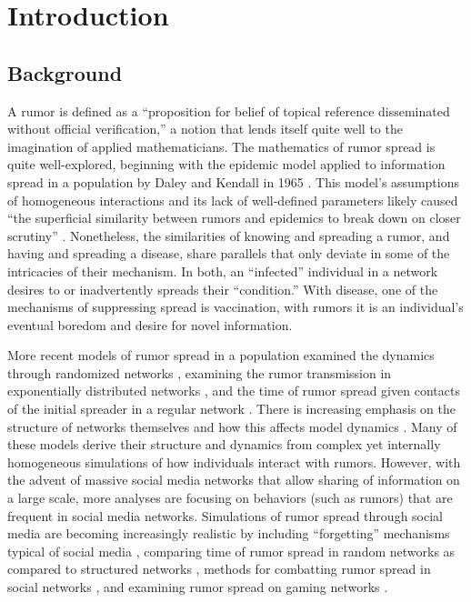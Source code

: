 \section{Introduction }
\label{sec:introduction}

\subsection{Background}
\label{subsec:background}

A rumor is defined as a ``proposition for belief of topical reference disseminated without official verification,'' \cite{knapp-1944} a notion that lends itself quite well to the imagination of applied mathematicians. The mathematics of rumor spread is quite well-explored, beginning with the epidemic model applied to information spread in a population by Daley and Kendall in 1965 \cite{daley-1965}. This model's assumptions of homogeneous interactions and its lack of well-defined parameters likely caused ``the superficial similarity between rumors and epidemics to break down on closer scrutiny'' \cite{daley-1965}. Nonetheless, the similarities of knowing and spreading a rumor, and having and spreading a disease, share parallels that only deviate in some of the intricacies of their mechanism. In both, an ``infected'' individual in a network desires to or inadvertently spreads their ``condition.'' With disease, one of the mechanisms of suppressing spread is vaccination, with rumors it is an individual's eventual boredom and desire for novel information.

More recent models of rumor spread in a population examined the dynamics through randomized networks \cite{karp-2000}, examining the rumor transmission in exponentially distributed networks \cite{moreno-2004}, and the time of rumor spread given contacts of the initial spreader in a regular network \cite{fount-2010}. There is increasing emphasis on the structure of networks themselves and how this affects model dynamics \cite{zhang-2013, pellis-2015, pellis-2012, ball-2010, zhou-2007}. Many of these models derive their structure and dynamics from complex yet internally homogeneous simulations of how individuals interact with rumors. However, with the advent of massive social media networks that allow sharing of information on a large scale, more analyses are focusing on behaviors (such as rumors) that are frequent in social media networks. Simulations of rumor spread through social media are becoming increasingly realistic by including ``forgetting'' mechanisms typical of social media \cite{zhao-2011}, comparing time of rumor spread in random networks as compared to structured networks \cite{liu-2011}, methods for combatting rumor spread in social networks \cite{tripathy-2010}, and examining rumor spread on gaming networks \cite{grab-2008}.

